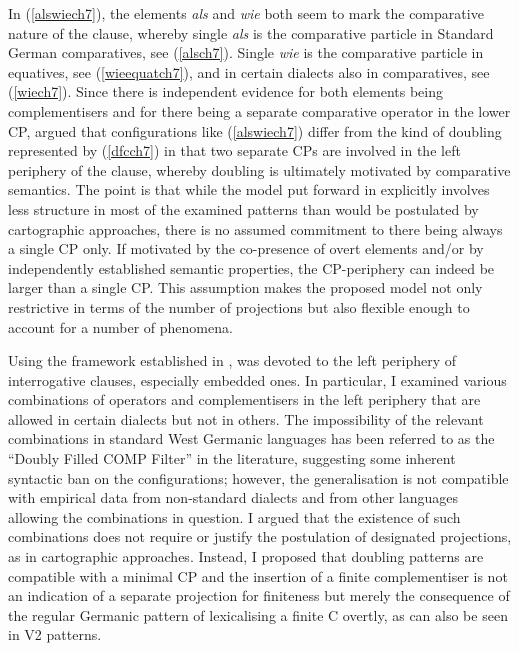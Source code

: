 In (\ref{alswiech7}), the elements \textit{als} and \textit{wie} both seem to mark the comparative nature of the clause, whereby single \textit{als} is the comparative particle in Standard German comparatives, see (\ref{alsch7}). Single \textit{wie} is the comparative particle in equatives, see (\ref{wieequatch7}), and in certain dialects also in comparatives, see (\ref{wiech7}). Since there is independent evidence for both elements being complementisers and for there being a separate comparative operator in the lower CP,  argued that configurations like (\ref{alswiech7}) differ from the kind of doubling represented by (\ref{dfcch7}) in that two separate CPs are involved in the left periphery of the clause, whereby doubling is ultimately motivated by comparative semantics. The point is that while the model put forward in  explicitly involves less structure in most of the examined patterns than would be postulated by cartographic approaches, there is no assumed commitment to there being always a single CP only. If motivated by the co-presence of overt elements and/or by independently established semantic properties, the CP-periphery can indeed be larger than a single CP. This assumption makes the proposed model not only restrictive in terms of the number of projections but also flexible enough to account for a number of phenomena.

Using the framework established in ,  was devoted to the left periphery of interrogative clauses, especially embedded ones. In particular, I examined various combinations of operators and complementisers in the left periphery that are allowed in certain dialects but not in others. The impossibility of the relevant combinations in standard West Germanic languages has been referred to as the ``Doubly Filled COMP Filter'' in the literature, suggesting some inherent syntactic ban on the configurations; however, the generalisation is not compatible with empirical data from non-standard dialects and from other languages allowing the combinations in question. I argued that the existence of such combinations does not require or justify the postulation of designated projections, as in cartographic approaches. Instead, I proposed that doubling patterns are compatible with a minimal CP and the insertion of a finite complementiser is not an indication of a separate projection for finiteness but merely the consequence of the regular Germanic pattern of lexicalising a finite C overtly, as can also be seen in V2 patterns.

